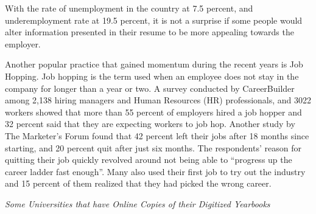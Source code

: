 \documentclass[journal]{./IEEE/IEEEtran}
\begin{document}
With the rate of unemployment in the country at 7.5 percent, and underemployment rate at 19.5 percent, it is not a surprise if some people would alter information presented in their resume to be more appealing towards the employer.\cite{ble}\par
Another popular practice that gained momentum during the recent years is Job Hopping. Job hopping is the term used when an employee does not stay in the company for longer than a year or two. A survey conducted by CareerBuilder among 2,138 hiring managers and Human Resources (HR) professionals, and 3022 workers showed that more than 55 percent of employers hired a job hopper and 32 percent said that they are expecting workers to job hop\cite{jobhop}. Another study by The Marketer’s Forum found that 42 percent left their jobs after 18 months since starting, and 20 percent quit after just six months. The respondents’ reason for quitting their job quickly revolved around not being able to “progress up the career ladder fast enough”. Many also used their first job to try out the industry and 15 percent of them realized that they had picked the wrong career\cite{gfog}. \\ \par

{\setlength{\parindent}{0pt}
\setlength{\parskip}{\baselineskip}
\textit{Some Universities that have Online Copies of their Digitized Yearbooks}}
\end{document}
